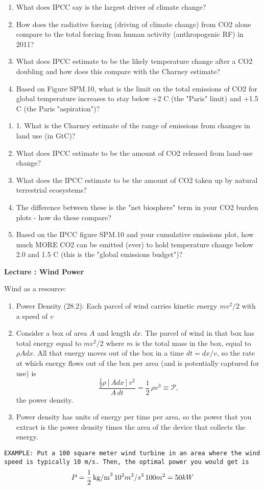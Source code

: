 \documentclass[11pt]{book}
\def\be{\begin{equation}}
\def\ee{\end{equation}}
\newcommand\example[1]{{\tt EXAMPLE: #1}}
\newcommand\bee{\begin{enumerate}}
\newcommand\eee{\end{enumerate}}
\newcommand\lecture[1]{\newpage
\addtocounter{lectureno}{1}
\setcounter{secno}{0}
\begin{center}
 {\bf Lecture \arabic{lectureno}: #1}
\end{center}
}
\newcounter{lectureno}
\newcounter{secno}
\begin{document}
\bee
\item What does IPCC say is the largest driver of climate change?
\item How does the radiative forcing (driving of climate change) from CO2 alone compare to the total forcing from human activity (anthropogenic RF) in 2011?
\item What does IPCC estimate to be the likely temperature change after a CO2 doubling and how does this compare with the Charney estimate?
\item Based on Figure SPM.10, what is the limit on the total emissions of CO2 for global temperature increases to stay below +2 C (the "Paris" limit) and +1.5 C (the Paris "aspiration")?
\eee


\bee
\item 1. What is the Charney estimate of the range of emissions from changes in land use (in GtC)?

\item What does IPCC estimate to be the amount of CO2 released from land-use change?

\item What does the IPCC estimate to be the amount of CO2 taken up by natural terrestrial ecosystems?

\item The difference between these is the "net biosphere" term in your CO2 burden plots - how do these compare?

\item Based on the IPCC figure SPM.10 and your cumulative emissions plot, how much MORE CO2 can be emitted (ever) to hold temperature change below 2.0 and 1.5 C (this is the "global emissions budget")?

\eee

\lecture{Wind Power}

Wind as a resource:
\bee
\item Power Density (28.2): Each parcel of wind carries kinetic energy $mv^2/2$ with a speed of $v$
\item Consider a box of area $A$ and length $dx$. The parcel of wind in that box has total energy equal to $mv^2/2$ where $m$ is the total mass in the box, equal to $\rho Adx$. All that energy moves out of the box in a time $dt=dx/v$, so the rate at which energy flows out of the box per area (and is potentially captured for use) is 
\be
\frac{\frac12 \rho  [A dx] v^2}{A\,dt}= \frac12\,\rho v^3\equiv \mathcal{P},
\ee
the power density.
\item Power density has units of energy per time per area, so the power that you extract is the power density times the area of the device that collects the energy.
\eee
\example{Put a 100 square meter wind turbine in an area where the wind speed is typically 10 m/s. Then, the optimal power you would get is
\be
P = \frac12\,{\rm kg/m}^3\, 10^3 m^3/s^3\, 100 m^2 = 50 kW
\ee}
\end{document}
